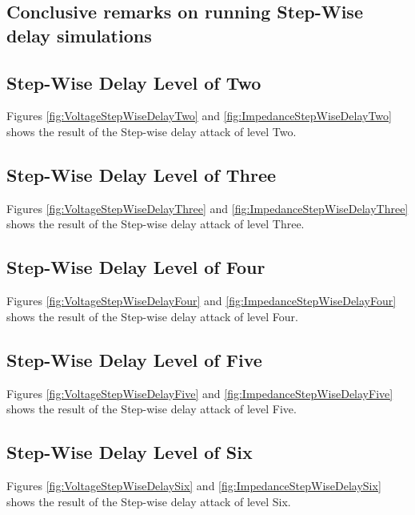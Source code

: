 

\newpage
\subsection{Conclusive remarks on running Step-Wise delay simulations}

\subsection{Step-Wise Delay Level of Two}
Figures \ref{fig:VoltageStepWiseDelayTwo} and \ref{fig:ImpedanceStepWiseDelayTwo} shows the result of the Step-wise delay attack of level Two.
\subsection{Step-Wise Delay Level of Three}
Figures \ref{fig:VoltageStepWiseDelayThree} and \ref{fig:ImpedanceStepWiseDelayThree} shows the result of the Step-wise delay attack of level Three.

\subsection{Step-Wise Delay Level of Four}
Figures \ref{fig:VoltageStepWiseDelayFour} and \ref{fig:ImpedanceStepWiseDelayFour} shows the result of the Step-wise delay attack of level Four.

\subsection{Step-Wise Delay Level of Five}
Figures \ref{fig:VoltageStepWiseDelayFive} and \ref{fig:ImpedanceStepWiseDelayFive} shows the result of the Step-wise delay attack of level Five.

\subsection{Step-Wise Delay Level of Six}
Figures \ref{fig:VoltageStepWiseDelaySix} and \ref{fig:ImpedanceStepWiseDelaySix} shows the result of the Step-wise delay attack of level Six.



